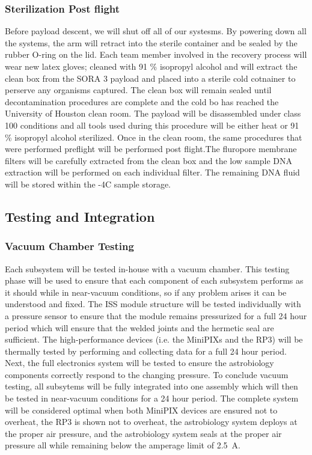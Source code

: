 \subsubsection{Sterilization Post flight}
Before payload descent, we will shut off all of our systesms. By powering down all the systems, the arm will retract into the sterile container and be sealed by the rubber O-ring on the lid. Each team member involved in the recovery process will wear new latex gloves; cleaned with 91 \% isopropyl alcohol and will extract the clean box from the SORA 3 payload and placed into a sterile cold cotnainer to perserve any organisms captured. The clean box will remain sealed until decontamination procedures are complete and the cold bo has reached the University of Houston clean room. The payload will be disassembled under class 100 conditions and all tools used during this procedure will be either heat or 91 \% isopropyl alcohol sterilized. Once in the clean room, the same procedures that were performed preflight will be performed post flight.The fluropore membrane filters will be carefully extracted from the clean box and the low sample DNA extraction will be performed on each individual filter. The remaining DNA fluid will be stored within the -4\degree C sample storage. 


\subsection{Testing and Integration}

\subsubsection{Vacuum Chamber Testing}
Each subsystem will be tested in-house with a vacuum chamber.
This testing phase will be used to ensure that each component of each subsystem performs as it should while in near-vacuum conditions, so if any problem arises it can be understood and fixed.
The ISS module structure will be tested individually with a pressure sensor to ensure that the module remains pressurized for a full \num{24} hour period which will ensure that the welded joints and the hermetic seal are sufficient.
The high-performance devices (i.e. the MiniPIXs and the RP3) will be thermally tested by performing and collecting data for a full \num{24} hour period.
Next, the full electronics system will be tested to ensure the astrobiology components correctly respond to the changing pressure.
To conclude vacuum testing, all subsytems will be fully integrated into one assembly which will then be tested in near-vacuum conditions for a \num{24} hour period.
The complete system will be considered optimal when both MiniPIX devices are ensured not to overheat, the RP3 is shown not to overheat, the astrobiology system deploys at the proper air pressure, and the astrobiology system seals at the proper air pressure all while remaining below the amperage limit of \SI{2.5}{\ampere}.

